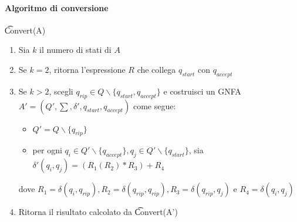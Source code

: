 \paragraph{Algoritmo di conversione}
\t{Convert(A)}
\begin{enumerate}
	\item Sia $k$ il numero di stati di $A$
	\item Se $k=2$, ritorna l'espressione $R$ che collega $q_{start}$ con $q_{accept}$
	\item Se $k > 2$, scegli $q_{rip} \in Q \backslash \{q_{start}, q_{accept}\}$ e costruisci un GNFA $A' = (Q',\sum, \delta ', q_{start}, q_{accept})$ come segue:
		\begin{itemize}
			\item $Q' = Q \backslash \{q_{rip}\}$
			\item per ogni $q_i \in Q' \backslash \{q_{accept}\}, q_j \in Q' \backslash \{q_{start}\}$, sia $\delta '(q_i,q_j) = (R_1(R_2)*R_3)+R_4$ 
		\end{itemize}
	 	 dove $R_1 = \delta (q_i,q_{rip}), R_2 = \delta (q_{rip}, q_{rip}), R_3 = \delta (q_{rip}, q_j)$ e $R_4=\delta (q_i, q_j)$
	 \item Ritorna il risultato calcolato da \t{Convert(A')}
\end{enumerate}

